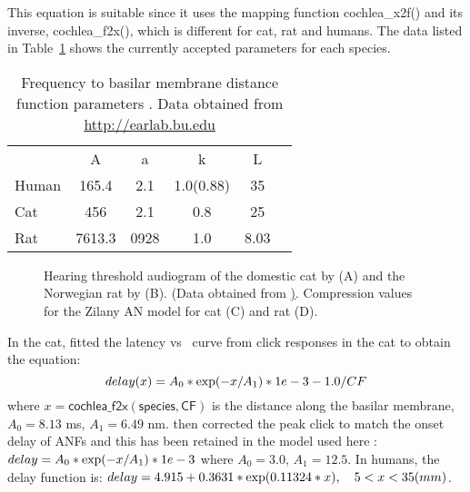 
This equation is suitable since it uses the mapping function \mbox{\textsf{cochlea\_x2f()}} and its inverse, \mbox{\textsf{cochlea\_f2x()}}, which is different for cat, rat and humans.
The data listed in Table~\ref{tab:f2x} shows the currently accepted parameters for each species.


\begin{table}[ht]
  \centering
  \begin{tabular}{lccccc}
  \hline
      &   A   &  a   &     k     & L \\
Human & 165.4 & 2.1  & 1.0(0.88) & 35\\
 Cat  &  456  & 2.1  &    0.8    & 25 \\
 Rat  & 7613.3& 0928 &    1.0    & 8.03 \\
  \hline
  \end{tabular}
  \caption[Basilar membrane frequency-distance function parameters]{Frequency to basilar membrane distance function parameters \citep{FitzGeraldBurkittEtAl:2001}. Data obtained from \url{http://earlab.bu.edu} \label{tab:f2x}}
\end{table}

\begin{figure}[htb]
  \begin{center}
    \caption[Audiogram and compression in rats and cats]%
{Hearing threshold audiogram of the domestic cat by \citet{HeffnerHeffner:1985} (A) and the Norwegian rat by \citet{HeffnerHeffner:1985} (B).
(Data obtained from \href{earlab.bu.edu}).
Compression values for the Zilany AN model for cat (C) and rat (D).
\label{fig:AudThresholdCatRat}}
  \end{center}
\end{figure}


In the cat, \citet{CarneyYin:1988} fitted the latency vs \CF~curve from click responses in the cat to obtain the equation:
\begin{equation}
  \label{eq:delay}
   delay (x) = A_0 * {\rm exp}(-x / A_1 ) * 1e-3 - 1.0/CF
\end{equation}
\noindent where $x = \mathsf{cochlea\_f2x(species, CF)}$ is the distance along the basilar membrane, $A_0 = 8.13$ ms, $A_1 = 6.49$ nm.
\citet{HeinzZhangEtAl:2001} then corrected the peak click to match the onset delay of ANFs and this has been retained in the model used here \citep{ZilanyBruceEtAl:2009}: \(delay = A_0 * {\rm exp}(-x / A_1) * 1e-3 \) where $A_0 = 3.0$, $A_1 = 12.5$. In humans, the delay function is: \( delay = 4.915 + 0.3631 * {\rm exp}(0.11324*x),\quad  5<x<35 (mm) \).

